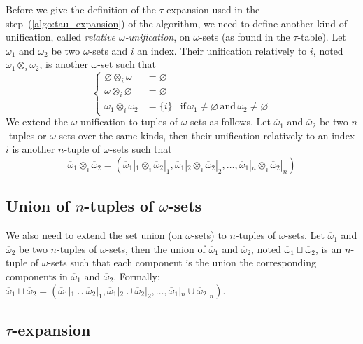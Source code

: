 Before we give the definition of the \(\tau\)-expansion used in the
step~(\ref{algo:tau_expansion}) of the algorithm, we need to define
another kind of unification, called \emph{relative
  \(\omega\)-unification}, on \(\omega\)-sets (as found in the
\(\tau\)-table). Let \(\omega_1\) and \(\omega_2\) be two
\(\omega\)-sets and \(i\) an index. Their unification relatively to
\(i\), noted \(\omega_1 \otimes_i \omega_2\), is another
\(\omega\)-set such that
\[
\left\{
\begin{aligned}
\varnothing \otimes_i \omega &= \varnothing\\
\omega \otimes_i \varnothing &= \varnothing\\
\omega_1 \otimes_i \omega_2  &= \{i\} & \text{if} \, \omega_1 \neq
\varnothing \, \text{and} \, \omega_2 \neq \varnothing
\end{aligned}
\right.
\]
We extend the \(\omega\)-unification to tuples of \(\omega\)-sets as
follows. Let \(\overline{\omega}_1\) and \(\overline{\omega}_2\) be
two \(n\)-tuples or \(\omega\)-sets over the same kinds, then their
unification relatively to an index \(i\) is another \(n\)-tuple of
\(\omega\)-sets such that
\[
\overline{\omega}_1 \otimes_i \overline{\omega}_2 =
(\overline{\omega}_1|_1 \otimes_i \overline{\omega}_2|_1, 
 \overline{\omega}_1|_2 \otimes_i \overline{\omega}_2|_2, \dots,
 \overline{\omega}_1|_n \otimes_i \overline{\omega}_2|_n)
\]


\subsection{Union of \(n\)-tuples of \(\omega\)-sets}

We also need to extend the set union (on \(\omega\)-sets) to
\(n\)-tuples of \(\omega\)-sets. Let \(\overline{\omega}_1\) and
\(\overline{\omega}_2\) be two \(n\)-tuples of \(\omega\)-sets, then
the union of \(\overline{\omega}_1\) and \(\overline{\omega}_2\),
noted \(\overline{\omega}_1 \sqcup \overline{\omega}_2\), is an
\(n\)-tuple of \(\omega\)-sets such that each component is the union
the corresponding components in \(\overline{\omega}_1\) and
\(\overline{\omega}_2\). Formally: \(\overline{\omega}_1 \sqcup
\overline{\omega}_2 = (\overline{\omega}_1|_1 \cup
\overline{\omega}_2|_1, \overline{\omega}_1|_2 \cup
\overline{\omega}_2|_2, \dots, \overline{\omega}_1|_n \cup
\overline{\omega}_2|_n)\).


\subsection{\(\tau\)-expansion}

